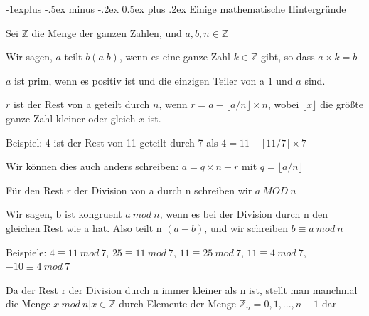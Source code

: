 \documentclass[a4paper]{article}
\makeatletter
\renewcommand{\subsection}{\@startsection{subsection}{2}{0mm}%
 {-1explus -.5ex minus -.2ex}%
 {0.5ex plus .2ex}%
 {\normalfont\normalsize\bfseries}}
\makeatother
\begin{document}
\begin{multicols}{3}
      \subsection{Einige mathematische Hintergründe}
      \begin{itemize*}
            \item Sei $\mathbb{Z}$ die Menge der ganzen Zahlen, und $a,b,n\in\mathbb{Z}$
            \item Wir sagen, $a$ teilt $b(a| b)$, wenn es eine ganze Zahl $k\in\mathbb{Z}$ gibt, so dass $a\times k=b$
            \item $a$ ist prim, wenn es positiv ist und die einzigen Teiler von a $1$ und $a$ sind.
            \item $r$ ist der Rest von a geteilt durch $n$, wenn $r=a-\lfloor a / n \rfloor\times n$, wobei
            $\lfloor x\rfloor$ die größte ganze Zahl kleiner oder gleich $x$ ist.
            \begin{itemize*}
                  \item Beispiel: 4 ist der Rest von 11 geteilt durch 7 als $4=11-\lfloor 11/7\rfloor\times 7$
                  \item Wir können dies auch anders schreiben: $a=q\times n + r$ mit $q=\lfloor a/n\rfloor$
            \end{itemize*}
            \item Für den Rest $r$ der Division von a durch n schreiben wir $a\ MOD\ n$
            \item Wir sagen, b ist kongruent $a\ mod\ n$, wenn es bei der Division durch n den gleichen Rest wie a hat. Also teilt n $(a-b)$, und wir schreiben $b\equiv a\ mod\ n$
            \item Beispiele: $4\equiv 11\ mod\ 7$, $25\equiv 11\ mod\ 7$, $11\equiv 25\ mod\ 7$, $11\equiv 4\ mod\ 7$, $-10\equiv 4\ mod\ 7$
            \item Da der Rest r der Division durch n immer kleiner als n ist, stellt man manchmal die Menge ${x\ mod\ n | x\in\mathbb{Z}}$ durch Elemente der Menge $\mathbb{Z}_n={0, 1, ..., n-1}$ dar
      \end{itemize*}


\end{multicols}
\end{document}
